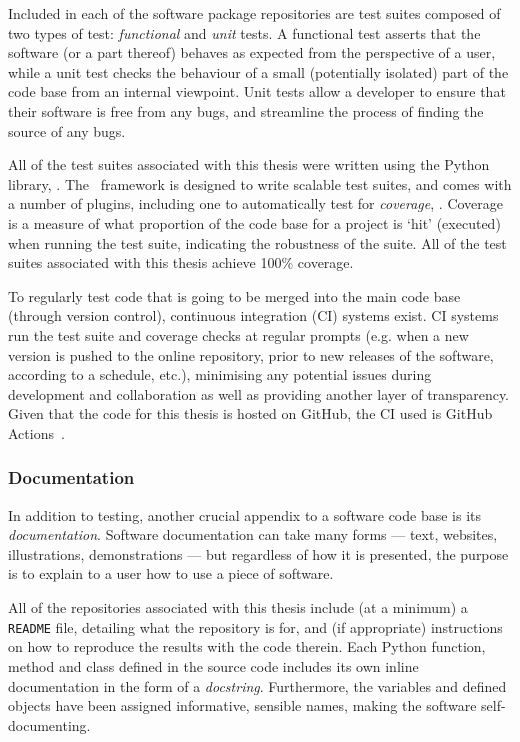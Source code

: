 Included in each of the software package repositories are test suites composed
of two types of test: \emph{functional} and \emph{unit} tests. A functional test
asserts that the software (or a part thereof) behaves as expected from the
perspective of a user, while a unit test checks the behaviour of a small
(potentially isolated) part of the code base from an internal viewpoint. Unit
tests allow a developer to ensure that their software is free from any bugs, and
streamline the process of finding the source of any bugs.

All of the test suites associated with this thesis were written using the Python
library, \href{https://docs.pytest.org/en/stable/}{\pytest}. The \pytest\
framework is designed to write scalable test suites, and comes with a number of
plugins, including one to automatically test for \emph{coverage},
\href{https://pytest-cov.readthedocs.io/en/latest/}{\pytestcov}.
Coverage is a measure of what proportion of the code base for a project is `hit'
(executed) when running the test suite, indicating the robustness of the suite.
All of the test suites associated with this thesis achieve 100\% coverage.


To regularly test code that is going to be merged into the main code base
(through version control), continuous integration (CI) systems exist. CI systems
run the test suite and coverage checks at regular prompts (e.g. when a new
version is pushed to the online repository, prior to new releases of the
software, according to a schedule, etc.), minimising any potential issues during
development and collaboration as well as providing another layer of
transparency. Given that the code for this thesis is hosted on GitHub, the CI
used is GitHub Actions~\cite{github-actions}.

\subsubsection{Documentation}

In addition to testing, another crucial appendix to a software code base is its
\emph{documentation}. Software documentation can take many forms --- text,
websites, illustrations, demonstrations --- but regardless of how it is
presented, the purpose is to explain to a user how to use a piece of software.

All of the repositories associated with this thesis include (at a minimum) a
\texttt{README} file, detailing what the repository is for, and (if
appropriate) instructions on how to reproduce the results with the code therein.
Each Python function, method and class defined in the source code includes its
own inline documentation in the form of a \emph{docstring}. Furthermore, the
variables and defined objects have been assigned informative, sensible names,
making the software self-documenting.

